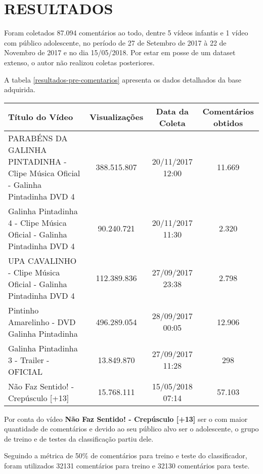 \section{RESULTADOS}

Foram coletados 87.094 comentários ao todo, dentre 5 vídeos infantis e 1 vídeo com público adolescente, no período de 27 de Setembro de 2017 à 22 de Novembro de 2017 e no dia 15/05/2018. Por estar em posse de um dataset extenso, o autor não realizou coletas posteriores. 

A tabela \ref{resultados-pre-comentarios} apresenta os dados detalhados da base adquirida.

\begin{table}[H]
	
\begin{tabular}{|p{5.5cm}|c|c|c|}
\hline
\textbf{Título do Vídeo} & \textbf{Visualizações} & \textbf{Data da Coleta} & \textbf{Comentários obtidos} \\ \hline
PARABÉNS DA GALINHA PINTADINHA - Clipe Música Oficial - Galinha Pintadinha DVD 4 & 388.515.807 & 20/11/2017 12:00 & 11.669 \\ \hline
Galinha Pintadinha 4 - Clipe Música Oficial - Galinha Pintadinha DVD 4 & 90.240.721 & 20/11/2017 11:30 & 2.320 \\ \hline
UPA CAVALINHO - Clipe Música Oficial - Galinha Pintadinha DVD 4 & 112.389.836 & 27/09/2017 23:38 & 2.798 \\ \hline
Pintinho Amarelinho - DVD Galinha Pintadinha & 496.289.054 & 28/09/2017 00:05 & 12.906 \\ \hline
Galinha Pintadinha 3 - Trailer - OFICIAL & 13.849.870 & 27/09/2017 11:28 & 298 \\ \hline
Não Faz Sentido! - Crepúsculo [+13] & 15.768.111 & 15/05/2018 07:14 & 57.103 \\ \hline
\end{tabular}

\end{table}

Por conta do vídeo \textbf{Não Faz Sentido! - Crepúsculo [+13]} ser o com maior quantidade de comentários e devido ao seu público alvo ser o adolescente, o grupo de treino e de testes da classificação partiu dele.

Seguindo a métrica de 50\% de comentários para treino e teste do classificador, foram utilizados 32131 comentários para treino e 32130 comentários para teste. 

